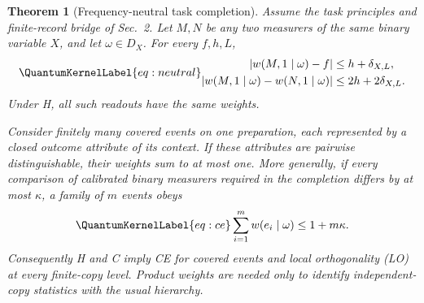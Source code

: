\documentclass[a4paper,11pt,twocolumn,unpublished]{quantumarticle}
\let\label\QuantumKernelLabel
\newtheorem{theorem}{Theorem}
\begin{document}
\begin{theorem}[Frequency-neutral task completion]\label{thm:frequency}
Assume the task principles and finite-record bridge of Sec.~2. Let $M,N$ be any two measurers of the same binary variable $X$, and let $\omega\in D_X$. For every $f,h,L$,
\begin{equation}\label{eq:neutral}
\begin{aligned}
 |w(M,1\mid\omega)-f|&\leq h+\delta_{X,L},\\
 |w(M,1\mid\omega)-w(N,1\mid\omega)|&\leq2h+2\delta_{X,L}.
\end{aligned}
\end{equation}
Under H, all such readouts have the same weights.

Consider finitely many covered events on one preparation, each represented by a closed outcome attribute of its context. If these attributes are pairwise distinguishable, their weights sum to at most one. More generally, if every comparison of calibrated binary measurers required in the completion differs by at most $\kappa$, a family of $m$ events obeys
\begin{equation}\label{eq:ce}
 \sum_{i=1}^m w(e_i\mid\omega)\leq1+m\kappa.
\end{equation}
Consequently H and C imply CE for covered events and local orthogonality (LO) at every finite-copy level. Product weights are needed only to identify independent-copy statistics with the usual hierarchy.
\end{theorem}
\end{document}
